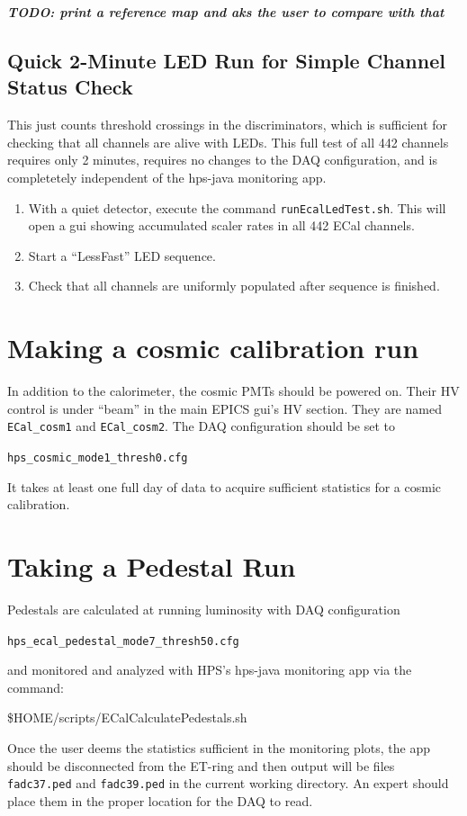 \documentclass[12pt]{article}
\begin{document}
{\bf {\it TODO: print a reference map and aks the user to compare with that}}

\subsection{Quick 2-Minute LED Run for Simple Channel Status Check}
This just counts threshold crossings in the discriminators, which is sufficient for checking that all channels are alive with LEDs.  This full test of all 442 channels requires only 2 minutes, requires no changes to the DAQ configuration, and is completetely independent of the hps-java monitoring app.

  \begin{enumerate}
      \item With a quiet detector, execute the command \texttt{runEcalLedTest.sh}.  This will open a gui showing accumulated scaler rates in all 442 ECal channels.  
      \item Start a ``LessFast'' LED sequence.
      \item Check that all channels are uniformly populated after sequence is finished.
  \end{enumerate}

   \section{Making a cosmic calibration run}

   In addition to the calorimeter, the cosmic PMTs should be powered on.  Their HV control is under ``beam'' in the main EPICS gui's HV section.  They are named \texttt{ECal\_cosm1} and \texttt{ECal\_cosm2}.  The DAQ configuration should be set to \begin{center}\texttt{hps\_cosmic\_mode1\_thresh0.cfg}\end{center}  It takes at least one full day of data to acquire sufficient statistics for a cosmic calibration.

   \section{Taking a Pedestal Run}

   Pedestals are calculated at running luminosity with DAQ configuration \begin{center}\texttt{hps\_ecal\_pedestal\_mode7\_thresh50.cfg}\end{center} and monitored and analyzed with HPS's hps-java monitoring app via the command:
   \begin{center}\$HOME/scripts/ECalCalculatePedestals.sh\end{center}
Once the user deems the statistics sufficient in the monitoring plots, the app should be disconnected from the ET-ring and then output will be files \texttt{fadc37.ped} and \texttt{fadc39.ped} in the current working directory.  An expert should place them in the proper location for the DAQ to read.
\end{document}
